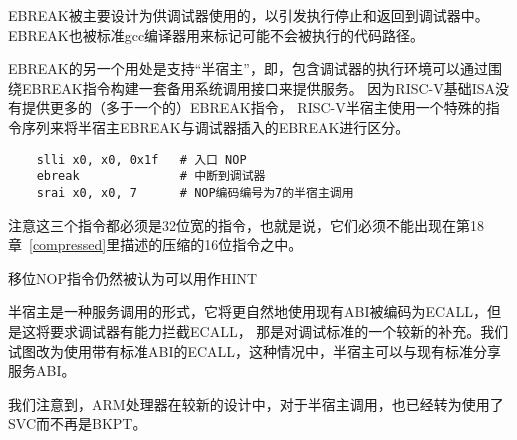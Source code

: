 \begin{commentary}
  EBREAK被主要设计为供调试器使用的，以引发执行停止和返回到调试器中。
  EBREAK也被标准gcc编译器用来标记可能不会被执行的代码路径。

  EBREAK的另一个用处是支持“半宿主”，即，包含调试器的执行环境可以通过围绕EBREAK指令构建一套备用系统调用接口来提供服务。
  因为RISC-V基础ISA没有提供更多的（多于一个的）EBREAK指令，
  RISC-V半宿主使用一个特殊的指令序列来将半宿主EBREAK与调试器插入的EBREAK进行区分。
\begin{verbatim}
    slli x0, x0, 0x1f   # 入口 NOP
    ebreak              # 中断到调试器
    srai x0, x0, 7      # NOP编码编号为7的半宿主调用
\end{verbatim}
  注意这三个指令都必须是32位宽的指令，也就是说，它们必须不能出现在第18章~\ref{compressed}里描述的压缩的16位指令之中。
  
   移位NOP指令仍然被认为可以用作HINT

   半宿主是一种服务调用的形式，它将更自然地使用现有ABI被编码为ECALL，但是这将要求调试器有能力拦截ECALL，
   那是对调试标准的一个较新的补充。我们试图改为使用带有标准ABI的ECALL，这种情况中，半宿主可以与现有标准分享服务ABI。
  
   我们注意到，ARM处理器在较新的设计中，对于半宿主调用，也已经转为使用了SVC而不再是BKPT。
\end{commentary}

